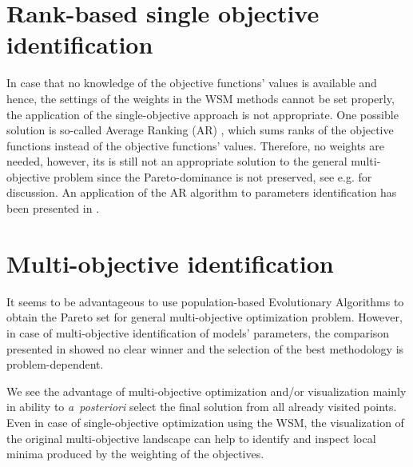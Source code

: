 \documentclass [12pt]{article}
\begin{document}
\section{Rank-based single objective identification}

In case that no knowledge of the objective functions' values is available and hence, the settings of the weights in the WSM methods cannot be set properly, the application of the single-objective approach is not appropriate. One possible solution is so-called Average Ranking (AR) \cite{Leps:2007}, which sums ranks of the objective functions instead of the objective functions' values. Therefore, no weights are needed, however, its is still not an appropriate solution to the general multi-objective problem since the Pareto-dominance is not preserved, see e.g. \cite{vitingerova:2010} for discussion. An application of the AR algorithm to parameters identification has been presented in \cite{Kuraz:2010:JCAM}.

\section{Multi-objective identification}

It seems to be advantageous to use population-based Evolutionary Algorithms to obtain the Pareto set for general multi-objective optimization problem. However, in case of multi-objective identification of models' parameters, the comparison presented in  \cite{vitingerova:2010} showed no clear winner and the selection of the best methodology is problem-dependent.

We see the advantage of multi-objective optimization and/or visualization mainly in ability to {\it a~posteriori} select the final solution from all already visited points. Even in case of single-objective optimization using the WSM, the visualization of the original multi-objective landscape can help to identify and inspect local minima produced by the weighting of the objectives.





\end{document}
